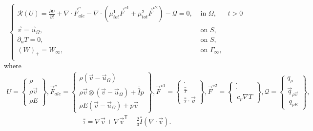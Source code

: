 \begin{equation} 
\label{rans}
\left\{\begin{array} {lll}
\mathcal{R}(U) = \frac{\partial U}{\partial t} + \nabla \cdot \vec{F}^{c}_{ale} -  \nabla \cdot ( \mu_{tot}^{1}\vec{F}^{v1} + \mu_{tot}^{2}\vec{F}^{v2}) - \mathcal{Q} = 0, & \mbox{  in } \Omega, & t > 0  \\
\vec{v} = \vec{u}_\Omega, &  \mbox{ on }  S,  \\
\partial_n T = 0, &  \mbox{ on }  S,   \\
(W)_+ = W_\infty,  & \mbox{ on }  \Gamma_\infty, \\
\end{array}\right.
\end{equation}
where
\begin{align} 
\label{euler_f}
U = \left \{ \begin{array}{c} \rho \\ \rho \vec{v} \\ \rho E \end{array} \right \},
\vec{F}^{c}_{ale} = \left \{ \begin{array}{c} \rho (\vec{v} - \vec{u}_\Omega)  \\ \rho \vec{v} \otimes  (\vec{v} - \vec{u}_\Omega) + \bar{\bar{I}} p \\ \rho E (\vec{v} - \vec{u}_\Omega) + p \vec{v}   \end{array} \right \},
\vec{F}^{v1} = \left \{ \begin{array}{c} \cdot \\ \bar{\bar{\tau}} \\ \bar{\bar{\tau}} \cdot \vec{v}  \end{array} \right  \},
\vec{F}^{v2} = \left \{ \begin{array}{c} \cdot \\ \cdot \\ \ c_p \nabla T   \end{array} \right \}, 
\mathcal{Q} = \left \{ \begin{array}{c} q_{\rho} \\ \vec{q}_{\rho \vec{v}} \\ \ q_{\rho E}   \end{array} \right \},
\end{align}
\begin{align} 
\label{tau}
\bar{\bar{\tau}} = \nabla \vec{v} + {\nabla \vec{v}}^\mathsf{T}  - \frac{2}{3} \bar{\bar{I}} (\nabla \cdot \vec{v} ).
\end{align}

